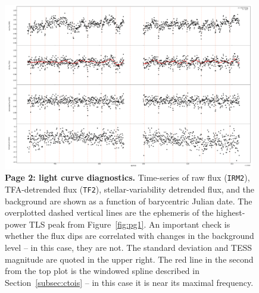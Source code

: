 \documentclass[12pt,twocolumn,tighten]{aastex62}
\begin{document}
\begin{figure}[!h]
	\begin{center}
		\leavevmode
		\includegraphics[width=0.98\textwidth]{gaiatwo0005541111035713815552-0007_page02.pdf}
	\end{center}
	\vspace{-0.5cm}
	\caption{
		{\bf Page 2: light curve diagnostics.} 
		Time-series of raw flux (\texttt{IRM2}),  TFA-detrended flux (\texttt{TF2}), stellar-variability
		detrended flux, and the background are shown as a function of
		barycentric Julian date.
		The overplotted dashed vertical lines are the ephemeris of the highest-power
		TLS peak from Figure~\ref{fig:pg1}.
		An important check is whether the flux dips are correlated with changes in the 
		background level -- in this case, they are not.
		The standard deviation and TESS magnitude are quoted in the upper right.
		The red line in the second from the top plot is the windowed 
		spline described in Section~\ref{subsec:ctois} -- in this case it is near its maximal
		frequency.
		\label{fig:pg2}
	}
\end{figure}
\end{document}
